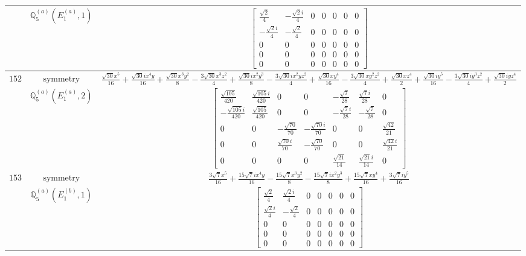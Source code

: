 \documentclass[fleqn,8pt,landscape]{jsarticle}
\begin{document}
\begin{longtable}{ccc}
$  $ & $ \mathbb{Q}_{5}^{(a)}(E_{1}^{(a)},1) $ & $ \begin{bmatrix} \frac{\sqrt{2}}{4} & - \frac{\sqrt{2} i}{4} & 0 & 0 & 0 & 0 & 0 \\ - \frac{\sqrt{2} i}{4} & - \frac{\sqrt{2}}{4} & 0 & 0 & 0 & 0 & 0 \\ 0 & 0 & 0 & 0 & 0 & 0 & 0 \\ 0 & 0 & 0 & 0 & 0 & 0 & 0 \\ 0 & 0 & 0 & 0 & 0 & 0 & 0 \end{bmatrix} $ \\ \hline
$ 152 $ & $ \text{symmetry} $ & $ \frac{\sqrt{30} x^{5}}{16} + \frac{\sqrt{30} i x^{4} y}{16} + \frac{\sqrt{30} x^{3} y^{2}}{8} - \frac{3 \sqrt{30} x^{3} z^{2}}{4} + \frac{\sqrt{30} i x^{2} y^{3}}{8} - \frac{3 \sqrt{30} i x^{2} y z^{2}}{4} + \frac{\sqrt{30} x y^{4}}{16} - \frac{3 \sqrt{30} x y^{2} z^{2}}{4} + \frac{\sqrt{30} x z^{4}}{2} + \frac{\sqrt{30} i y^{5}}{16} - \frac{3 \sqrt{30} i y^{3} z^{2}}{4} + \frac{\sqrt{30} i y z^{4}}{2} $ \\
$  $ & $ \mathbb{Q}_{5}^{(a)}(E_{1}^{(a)},2) $ & $ \begin{bmatrix} \frac{\sqrt{105}}{420} & \frac{\sqrt{105} i}{420} & 0 & 0 & - \frac{\sqrt{7}}{28} & \frac{\sqrt{7} i}{28} & 0 \\ - \frac{\sqrt{105} i}{420} & \frac{\sqrt{105}}{420} & 0 & 0 & - \frac{\sqrt{7} i}{28} & - \frac{\sqrt{7}}{28} & 0 \\ 0 & 0 & - \frac{\sqrt{70}}{70} & - \frac{\sqrt{70} i}{70} & 0 & 0 & \frac{\sqrt{42}}{21} \\ 0 & 0 & \frac{\sqrt{70} i}{70} & - \frac{\sqrt{70}}{70} & 0 & 0 & \frac{\sqrt{42} i}{21} \\ 0 & 0 & 0 & 0 & \frac{\sqrt{21}}{14} & \frac{\sqrt{21} i}{14} & 0 \end{bmatrix} $ \\ \hline
$ 153 $ & $ \text{symmetry} $ & $ \frac{3 \sqrt{7} x^{5}}{16} + \frac{15 \sqrt{7} i x^{4} y}{16} - \frac{15 \sqrt{7} x^{3} y^{2}}{8} - \frac{15 \sqrt{7} i x^{2} y^{3}}{8} + \frac{15 \sqrt{7} x y^{4}}{16} + \frac{3 \sqrt{7} i y^{5}}{16} $ \\
$  $ & $ \mathbb{Q}_{5}^{(a)}(E_{1}^{(b)},1) $ & $ \begin{bmatrix} \frac{\sqrt{2}}{4} & \frac{\sqrt{2} i}{4} & 0 & 0 & 0 & 0 & 0 \\ \frac{\sqrt{2} i}{4} & - \frac{\sqrt{2}}{4} & 0 & 0 & 0 & 0 & 0 \\ 0 & 0 & 0 & 0 & 0 & 0 & 0 \\ 0 & 0 & 0 & 0 & 0 & 0 & 0 \\ 0 & 0 & 0 & 0 & 0 & 0 & 0 \end{bmatrix} $ \\ \hline

\end{longtable}
\end{document}
